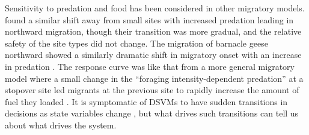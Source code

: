 

Sensitivity to predation and food has been considered in other migratory models. \citet{Taylor2007} found a similar shift away from small sites with increased predation leading in northward migration, though their transition was more gradual, and the relative safety of the site types did not change. The migration of barnacle geese northward showed a similarly dramatic shift in migratory onset with an increase in predation \citep{Jonker2010}. The response curve was like that from a more general migratory model where a small change in the ``foraging intensity-dependent predation'' at a stopover site led migrants at the previous site to rapidly increase the amount of fuel they loaded \citep{Weber1998}. It is symptomatic of DSVMs to have sudden transitions in decisions as state variables change \citep{ClarkMangel2000}, but what drives such transitions can tell us about what drives the system.


